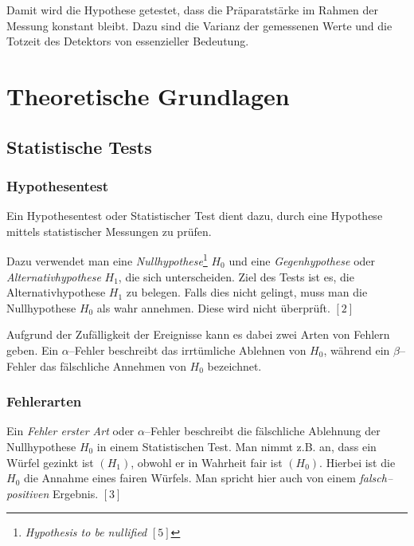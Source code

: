 \documentclass[12pt,a4paper]{scrartcl}
\numberwithin{equation}{section} %
\renewcommand{\[}{} %
\renewcommand{\]}{\noindent} %
\begin{document}
Damit wird die Hypothese getestet, dass die Präparatstärke im Rahmen der
Messung konstant bleibt. Dazu sind die Varianz der gemessenen Werte und
die Totzeit des Detektors von essenzieller Bedeutung.

\clearpage
\hypertarget{theoretische-grundlagen}{%
\section{Theoretische Grundlagen}\label{theoretische-grundlagen}}

\hypertarget{statistische-tests}{%
\subsection{Statistische Tests}\label{statistische-tests}}

\hypertarget{hypothesentest}{%
\subsubsection{Hypothesentest}\label{hypothesentest}}

Ein Hypothesentest oder Statistischer Test dient dazu, durch eine
Hypothese mittels statistischer Messungen zu prüfen.

Dazu verwendet man eine \emph{Nullhypothese}\footnote{\emph{Hypothesis
  to be nullified} \([5]\)} \(H_0\) und eine \emph{Gegenhypothese} oder
\emph{Alternativhypothese} \(H_1\), die sich unterscheiden. Ziel des
Tests ist es, die Alternativhypothese \(H_1\) zu belegen. Falls dies
nicht gelingt, muss man die Nullhypothese \(H_0\) als wahr annehmen.
Diese wird nicht überprüft. \([2]\)

Aufgrund der Zufälligkeit der Ereignisse kann es dabei zwei Arten von
Fehlern geben. Ein \(\alpha\)--Fehler beschreibt das irrtümliche
Ablehnen von \(H_0\), während ein \(\beta\)--Fehler das fälschliche
Annehmen von \(H_0\) bezeichnet.

\hypertarget{fehlerarten}{%
\subsubsection{Fehlerarten}\label{fehlerarten}}

Ein \emph{Fehler erster Art} oder \(\alpha\)--Fehler beschreibt die
fälschliche Ablehnung der Nullhypothese \(H_0\) in einem Statistischen
Test. Man nimmt z.B. an, dass ein Würfel gezinkt ist \((H_1)\), obwohl
er in Wahrheit fair ist \((H_0)\). Hierbei ist die \(H_0\) die Annahme
eines fairen Würfels. Man spricht hier auch von einem
\emph{falsch--positiven} Ergebnis. \([3]\)
\end{document}
